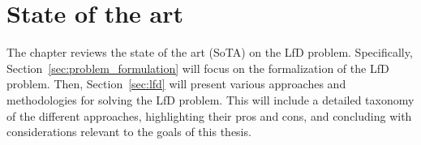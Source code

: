 \section{State of the art}
\label{sec:sota}
The chapter reviews the state of the art (SoTA) on the LfD problem. Specifically, Section~\ref{sec:problem_formulation} will focus on the formalization of the LfD problem. Then, Section~\ref{sec:lfd} will present various approaches and methodologies for solving the LfD problem. This will include a detailed taxonomy of the different approaches, highlighting their pros and cons, and concluding with considerations relevant to the goals of this thesis.


